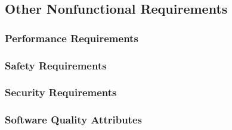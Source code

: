 \subsection{ Other Nonfunctional Requirements}
\subsubsection{Performance Requirements}
\subsubsection{ Safety Requirements}
\subsubsection{ Security Requirements}
\subsubsection{ Software Quality Attributes}